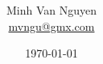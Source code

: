 \documentclass[a4paper,oneside,12pt]{article}
\begin{document}
\title{\Large\bf <Insert title>}
\author{%
  Minh Van Nguyen \\
  \url{mvngu@gmx.com}
}
\date{\today}
\maketitle
\end{document}
